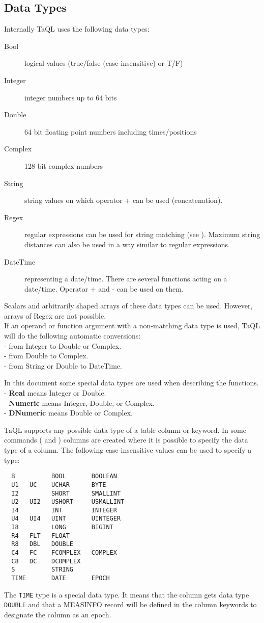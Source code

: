 \subsection{\label{TAQL:DATATYPES}Data Types}
Internally TaQL uses the following data types:
\begin{description}
  \item[Bool ] logical values (true/false (case-insensitive) or T/F)
  \item[Integer ] integer numbers up to 64 bits
  \item[Double ] 64 bit floating point numbers including times/positions
  \item[Complex ] 128 bit complex numbers
  \item[String ] string values on which operator + can be used (concatenation).
  \item[Regex ] regular expressions can be used for string
    matching (see ). Maximum string
    distances can also be used in a way similar to regular
    expressions. 
  \item[DateTime ] representing a date/time. There are several functions
       acting on a date/time. Operator + and - can be used on them.
\end{description}
Scalars and arbitrarily shaped arrays of these data types can be used.
However, arrays of Regex are not possible.
\\If an operand or function argument with a non-matching data type
is used, TaQL will do the following automatic conversions:
\\- from Integer to Double or Complex.
\\- from Double to Complex.
\\- from String or Double to DateTime.

In this document some special data types are used when describing the functions.
\\- \textbf{Real} means Integer or Double.
\\- \textbf{Numeric} means Integer, Double, or Complex.
\\- \textbf{DNumeric} means Double or Complex.

\label{TAQL:DATATYPESTRING}
TaQL supports any possible data type of a table column or keyword.
In some commands ( and
) columns are created where
it is possible to specify the data type of a column. 
The following case-insensitive values can be used to specify a type:
\begin{verbatim}
  B          BOOL       BOOLEAN
  U1   UC    UCHAR      BYTE
  I2         SHORT      SMALLINT
  U2   UI2   USHORT     USMALLINT
  I4         INT        INTEGER
  U4   UI4   UINT       UINTEGER
  I8         LONG       BIGINT
  R4   FLT   FLOAT
  R8   DBL   DOUBLE
  C4   FC    FCOMPLEX   COMPLEX
  C8   DC    DCOMPLEX
  S          STRING
  TIME       DATE       EPOCH
\end{verbatim}
The \texttt{TIME} type is a special data type. It means that the column
gets data type \texttt{DOUBLE} and that a MEASINFO record will be
defined in the column keywords to designate the column as an epoch.

